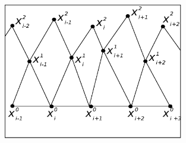 \documentclass[screen]{beamer}
\begin{document}
\begin{frame}
{\begin{figure}[b]
			\centering
			\includegraphics[width=0.7\textwidth]{fig/charWaveEq3rdStep.eps}
		\end{figure}
	}
\end{frame}
\end{document}
